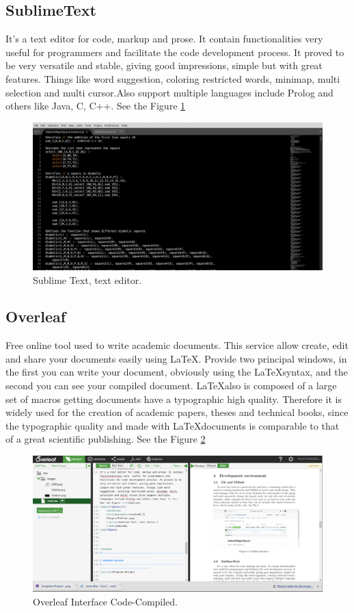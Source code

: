 \documentclass[12pt]{article}
\begin{document}
\subsection{SublimeText}
It's a text editor for code, markup and prose. It contain functionalities very  useful for programmers and facilitate the code development process. It proved to be very versatile and stable, giving good impressions, simple but with great features. Things like word suggestion, coloring restricted words, minimap, multi selection and multi cursor.Also support multiple languages include Prolog and others like Java, C, C++. See the Figure \ref{Sublime}
\begin{figure}[h!]
 	\centering
  	\includegraphics[scale=0.3]
  	{Images/Sublime.png}    
  	\caption{Sublime Text, text editor.}
    \label{Sublime}
\end{figure}

\subsection{Overleaf}
Free online tool used to write academic documents. This service allow create, edit and share your documents easily using \LaTeX. Provide two principal windows, in the first you can write your document, obviously using the \LaTeX syntax, and the second you can see your compiled document. \LaTeX also is composed of a large set of macros getting documents have a typographic high quality. Therefore it is widely used for the creation of academic papers, theses and technical books, since the typographic quality and made with \LaTeX documents is comparable to that of a great scientific publishing. See the Figure \ref{overleaf}
\begin{figure}[h!]
 	\centering
  	\includegraphics[scale=0.3]
  	{Images/Overleaf.png}
  	\caption{Overleaf Interface Code-Compiled.}
     \label{overleaf}
\end{figure}
\end{document}
